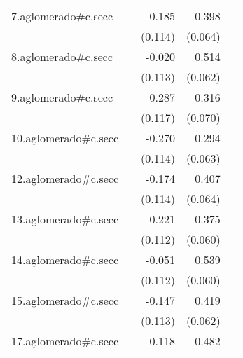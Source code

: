 {\begin{longtable}{l*{4}{D{.}{.}{-1}}}
\addlinespace
7.aglomerado#c.secc&                     &      -0.185         &       0.398\sym{***}&                     \\
            &                     &     (0.114)         &     (0.064)         &                     \\
\addlinespace
8.aglomerado#c.secc&                     &      -0.020         &       0.514\sym{***}&                     \\
            &                     &     (0.113)         &     (0.062)         &                     \\
\addlinespace
9.aglomerado#c.secc&                     &      -0.287\sym{*}  &       0.316\sym{***}&                     \\
            &                     &     (0.117)         &     (0.070)         &                     \\
\addlinespace
10.aglomerado#c.secc&                     &      -0.270\sym{*}  &       0.294\sym{***}&                     \\
            &                     &     (0.114)         &     (0.063)         &                     \\
\addlinespace
12.aglomerado#c.secc&                     &      -0.174         &       0.407\sym{***}&                     \\
            &                     &     (0.114)         &     (0.064)         &                     \\
\addlinespace
13.aglomerado#c.secc&                     &      -0.221\sym{*}  &       0.375\sym{***}&                     \\
            &                     &     (0.112)         &     (0.060)         &                     \\
\addlinespace
14.aglomerado#c.secc&                     &      -0.051         &       0.539\sym{***}&                     \\
            &                     &     (0.112)         &     (0.060)         &                     \\
\addlinespace
15.aglomerado#c.secc&                     &      -0.147         &       0.419\sym{***}&                     \\
            &                     &     (0.113)         &     (0.062)         &                     \\
\addlinespace
17.aglomerado#c.secc&                     &      -0.118         &       0.482\sym{***}&                     \\

\end{longtable}}
